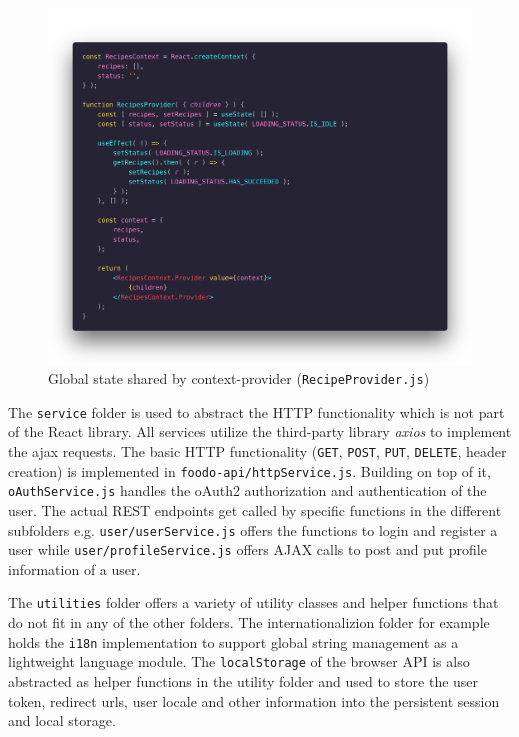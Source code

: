 \begin{figure}[!ht]
	\captionsetup{justification=centering}
	\centering
	\includegraphics[scale=0.28]{Ressourcen/img/code/context.png}
	\vspace{-4em}
	\caption{Global state shared by context-provider (\texttt{RecipeProvider.js})}
\end{figure}

The \texttt{service} folder is used to abstract the HTTP functionality which is not part of the React library. All services utilize the third-party library \textit{axios} to implement the \gls{ajax} requests. The basic HTTP functionality (\texttt{GET}, \texttt{POST}, \texttt{PUT}, \texttt{DELETE}, header creation) is implemented in \texttt{foodo-api/httpService.js}. Building on top of it, \texttt{oAuthService.js} handles the oAuth2 authorization and authentication of the user. The actual REST endpoints get called by specific functions in the different subfolders e.g. \texttt{user/userService.js} offers the functions to login and register a user while \texttt{user/profileService.js} offers AJAX calls to post and put profile information of a user.

The \texttt{utilities} folder offers a variety of utility classes and helper functions that do not fit in any of the other folders. The internationalizion folder for example holds the \texttt{i18n} implementation to support global string management as a lightweight language module. The \texttt{localStorage} of the browser API is also abstracted as helper functions in the utility folder and used to store the user token, redirect urls, user locale and other information into the persistent session and local storage. 

